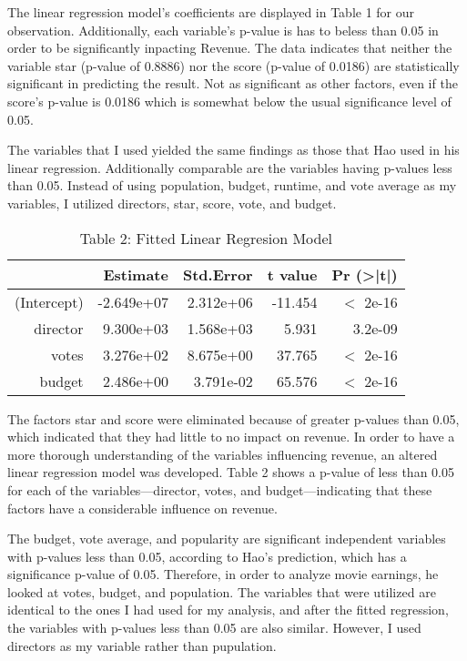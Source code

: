 \documentclass[12pt]{article}
\begin{document}
The linear regression model's coefficients are displayed in Table 1 for our observation. 
Additionally, each variable's p-value is has to beless than 0.05 in order to be significantly
inpacting Revenue. The data indicates that neither the variable star (p-value of 0.8886) 
nor the score (p-value of 0.0186) are statistically significant in predicting the result.
Not as significant as other factors, even if the score's p-value is 0.0186 which is somewhat
below the usual significance level of 0.05. 

The variables that I used yielded the same findings as those that Hao used in his linear regression.
Additionally comparable are the variables having p-values less than 0.05. Instead of using population,
budget, runtime, and vote average as my variables, I utilized directors, star, score, vote, and budget.

\begin{table}[h]
\caption{Table 2: Fitted Linear Regresion Model}
\centering
\begin{tabular}{rrrrr}
\hline
 & Estimate   & Std.Error & t value & Pr (\textgreater|t|) \\ 
\hline
(Intercept) & -2.649e+07 & 2.312e+06 & -11.454 & $<$ 2e-16 \\
director    & 9.300e+03  & 1.568e+03 & 5.931   & 3.2e-09 \\
votes       & 3.276e+02  & 8.675e+00 & 37.765  & $<$ 2e-16 \\
budget      & 2.486e+00  & 3.791e-02 & 65.576  & $<$ 2e-16 \\
\hline
\end{tabular}
\end{table}

The factors star and score were eliminated because of greater p-values than 0.05, 
which indicated that they had little to no impact on revenue. In order to have a 
more thorough understanding of the variables influencing revenue, an altered linear 
regression model was developed. Table 2 shows a p-value of less than 0.05 for each 
of the variables—director, votes, and budget—indicating that these factors have a
considerable influence on revenue.

The budget, vote average, and popularity are significant independent variables with
p-values less than 0.05, according to Hao's prediction, which has a significance p-value
of 0.05. Therefore, in order to analyze movie earnings, he looked at votes, budget, and 
population. The variables that were utilized are identical to the ones I had used for my 
analysis, and after the fitted regression, the variables with p-values less than 0.05 are
also similar. However, I used directors as my variable rather than pupulation.
\end{document}
